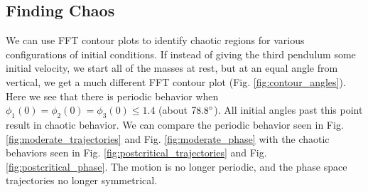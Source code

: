 \documentclass{article}
\begin{document}
\subsection{Finding Chaos}
We can use FFT contour plots to identify chaotic regions for various 
configurations of initial conditions. If instead of giving the third 
pendulum some initial velocity, we start all of the masses at rest, but 
at an equal angle from vertical, we get a much different FFT contour plot 
(Fig. \ref{fig:contour_angles}). Here we see that there is periodic behavior 
when $\phi_1(0) = \phi_2(0) = \phi_3(0) \leq 1.4$ (about $78.8\degree$). 
All initial angles past this point result in chaotic behavior. We can 
compare the periodic behavior seen in Fig. \ref{fig:moderate_trajectories} 
and Fig. \ref{fig:moderate_phase} with the chaotic behaviors seen in Fig.
\ref{fig:postcritical_trajectories} and Fig. \ref{fig:postcritical_phase}. 
The motion is no longer periodic, and the phase space trajectories no 
longer symmetrical.
\end{document}
